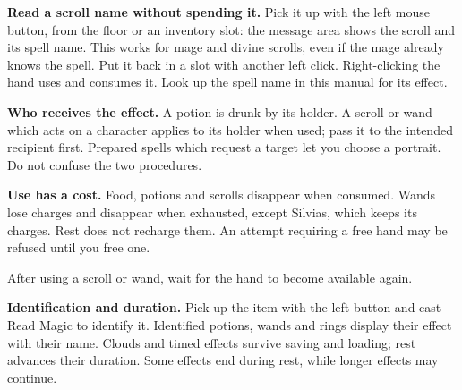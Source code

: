 
\textbf{Read a scroll name without spending it.} Pick it up with the left mouse button, from the floor or an inventory slot: the message area shows the scroll and its spell name. This works for mage and divine scrolls, even if the mage already knows the spell. Put it back in a slot with another left click. Right-clicking the hand uses and consumes it. Look up the spell name in this manual for its effect.

\textbf{Who receives the effect.} A potion is drunk by its holder. A scroll or wand which acts on a character applies to its holder when used; pass it to the intended recipient first. Prepared spells which request a target let you choose a portrait. Do not confuse the two procedures.

\textbf{Use has a cost.} Food, potions and scrolls disappear when consumed. Wands lose charges and disappear when exhausted, except Silvias, which keeps its charges. Rest does not recharge them. An attempt requiring a free hand may be refused until you free one.

After using a scroll or wand, wait for the hand to become available again.

\textbf{Identification and duration.} Pick up the item with the left button and cast Read Magic to identify it. Identified potions, wands and rings display their effect with their name. Clouds and timed effects survive saving and loading; rest advances their duration. Some effects end during rest, while longer effects may continue.


